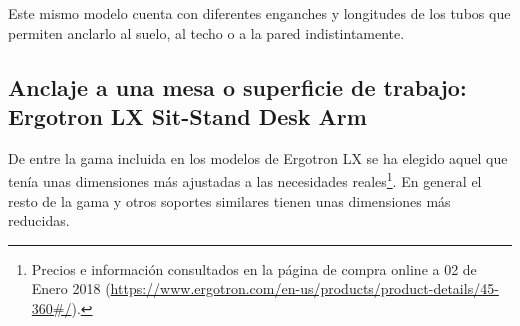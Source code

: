  Este mismo modelo cuenta con diferentes enganches y longitudes de los tubos que permiten anclarlo al suelo, al techo o a la pared indistintamente.
 \\ 
 
 
\subsection{Anclaje a una mesa o superficie de trabajo: Ergotron LX Sit-Stand Desk Arm} 
 
 
 De entre la gama incluida en los modelos de Ergotron LX se ha elegido aquel que tenía unas dimensiones más ajustadas a las necesidades reales\footnote{Precios e información consultados en la página de compra online a 02 de Enero 2018 (\url{https://www.ergotron.com/en-us/products/product-details/45-360\#/}).}. En general el resto de la gama y otros soportes similares tienen unas dimensiones más reducidas.
 
